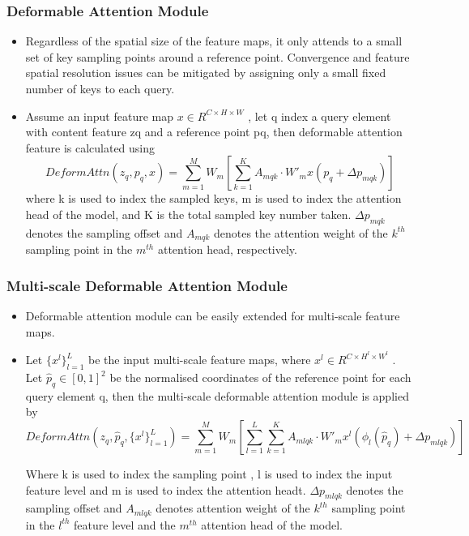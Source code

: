 \subsubsection{Deformable Attention Module} 
\begin{itemize}
	\item Regardless of the spatial size of the feature maps, it only attends to a small set of key sampling points around a reference point. Convergence and feature spatial resolution issues can be mitigated by assigning only a small fixed number of keys to each query.
	\item Assume an input feature map $x \in R^{C\times H \times W}$ , let q index a query element with content feature zq and a reference point pq, then deformable attention feature is calculated using
	$$ DeformAttn(z_q, p_q, x) = \displaystyle\sum\limits_{m=1}^M W_m
	[\displaystyle\sum\limits_{k=1}^K A_{mqk}\cdot W'_mx(p_q+\Delta p_{mqk})]
	$$
	where k is used to index the sampled keys, m is used to index the attention head of the model, and K is the total sampled key number taken. $\Delta p_{mqk}$ denotes the sampling offset and  $A_{mqk}$ denotes the attention weight of the $k^{th}$ sampling point in the $m^{th}$ attention head, respectively.
\end{itemize}

\subsubsection{Multi-scale Deformable Attention Module}
\begin{itemize}
	\item Deformable attention module can be easily extended for multi-scale feature maps.  
	\item Let $\{{x^l}\}_{l=1}^L$ be the input multi-scale feature maps, where  $x^l \in R^{C\times H^l \times W^l}$ . Let $ \hat p_q \in [0, 1]^2$ be the normalised coordinates of the reference point for each query element q, then the multi-scale deformable attention module is applied by 
	$$DeformAttn(z_q, \hat{p}_q, \{{x^l}\}_{l=1}^L) = 
	\displaystyle\sum\limits_{m=1}^M W_m
	[\displaystyle\sum\limits_{l=1}^L\displaystyle\sum\limits_{k=1}^K A_{mlqk}\cdot W'_mx^l(\phi _l (\hat p_q)+\Delta p_{mlqk})]$$
	
	Where k is used to index the sampling point , l is used to index the input feature level and m is used to index the attention headt. $\Delta p_{mlqk}$ denotes the sampling offset and $A_{mlqk}$ denotes attention weight of the $k^{th}$ sampling point in the $l^{th}$ feature level and the $m^{th}$ attention head of the model.
\end{itemize}


